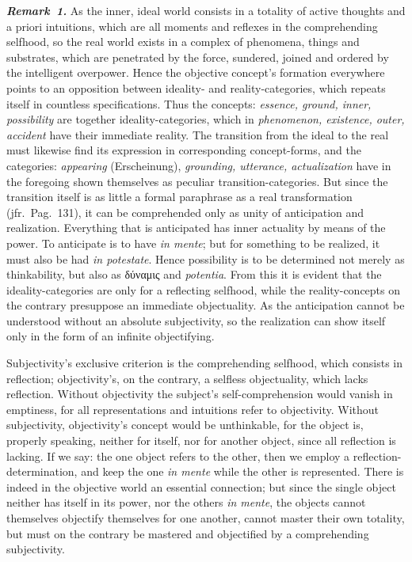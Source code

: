 \documentclass[12pt]{book}
\newcommand{\anm}[1]{\emph{\textbf{Remark~#1.}}}
\begin{document}
\anm{1} As the inner, ideal world consists in a totality of active thoughts
and a priori intuitions, which are all moments and reflexes in the
comprehending selfhood, so the real world exists in a complex of phenomena,
things and substrates, which are penetrated by the force, sundered, joined
and ordered by the intelligent overpower. Hence the objective concept's
formation everywhere points to an opposition between ideality- and
reality-categories, which repeats itself in countless specifications. Thus
the concepts: \emph{essence, ground, inner, possibility} are together
ideality-categories, which in \emph{phenomenon, existence, outer, accident}
have their immediate reality. The transition from the ideal to the real must
likewise find its expression in corresponding concept-forms, and the
categories: \emph{appearing} (Erscheinung), \emph{grounding, utterance,
actualization} have in the foregoing shown themselves as peculiar
transition-categories. But since the transition itself is as little a formal
paraphrase as a real transformation (jfr.\ Pag.\ 131), it can be
comprehended only as unity of anticipation and realization. Everything that
is anticipated has inner actuality by means of the power. To anticipate is
to have \textit{in mente}; but for something to be realized, it must also be
had \textit{in potestate}. Hence possibility is to be determined not merely
as thinkability, but also as δύναμις and \textit{potentia}. From this it is
evident that the ideality-categories are only for a reflecting selfhood,
while the reality-concepts on the contrary presuppose an immediate
objectuality. As the anticipation cannot be understood without an absolute
subjectivity, so the realization can show itself only in the form of an
infinite objectifying.

Subjectivity's exclusive criterion is the comprehending selfhood, which
consists in reflection; objectivity's, on the contrary, a selfless
objectuality, which lacks reflection. Without objectivity the subject's
self-comprehension would vanish in emptiness, for all representations and
intuitions refer to objectivity. Without subjectivity, objectivity's concept
would be unthinkable, for the object is, properly speaking, neither for
itself, nor for another object, since all reflection is lacking. If we say:
the one object refers to the other, then we employ a
reflection-determination, and keep the one \textit{in mente} while the other
is represented. There is indeed in the objective world an essential
connection; but since the single object neither has itself in its power, nor
the others \textit{in mente}, the objects cannot themselves objectify
themselves for one another, cannot master their own totality, but must on
the contrary be mastered and objectified by a comprehending subjectivity.
\end{document}
